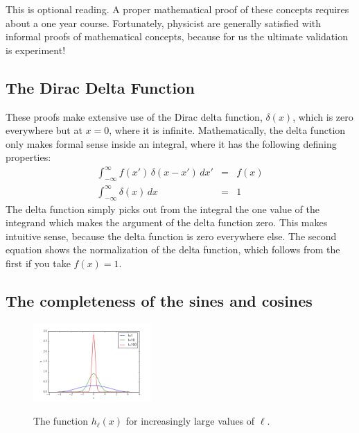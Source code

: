 \documentclass[12pt]{article}
\begin{document}
This is optional reading.  A proper mathematical proof of these concepts requires about a one year course.  Fortunately, physicist are generally satisfied with informal proofs of mathematical concepts, because for us the ultimate validation is experiment!

\subsection{The Dirac Delta Function}

These proofs make extensive use of the Dirac delta function, $\delta(x)$, which is zero everywhere but at $x=0$, where it is infinite.  Mathematically, the delta function only makes formal sense inside an integral, where it has the following defining properties:
\begin{eqnarray}
\int_{-\infty}^{\infty} f(x') \, \delta(x-x') \, dx' &=& f(x) \\
\int_{-\infty}^{\infty} \delta(x) \, dx &=& 1 \label{eqn:norm}
 \end{eqnarray}
The delta function simply picks out from the integral the one value of the integrand which makes the argument of the delta function zero.  This makes intuitive sense, because the delta function is zero everywhere else.  The second equation shows the normalization of the delta function, which follows from the first if you take $f(x)=1$.


\subsection{The completeness of the sines and cosines}

\begin{figure}[thb]
\begin{center}
{\includegraphics[width=0.40\textwidth]{figs/hk.png}}
\end{center}
\caption{\label{fig:hl} The function $h_\ell(x)$ for increasingly large values of $\ell$.}
\end{figure}
\end{document}
